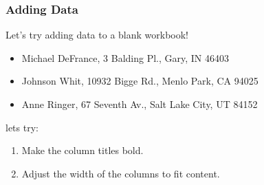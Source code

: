 \documentclass[12pt]{beamer}
\begin{document}
	\begin{frame}
		\frametitle{Adding Data}
		Let's try adding data to a blank workbook!
		\begin{itemize}
			\item Michael DeFrance, 3 Balding Pl., Gary, IN 46403
			\item Johnson Whit, 10932 Bigge Rd., Menlo Park, CA 94025
			\item Anne Ringer, 67 Seventh Av., Salt Lake City, UT 84152
		\end{itemize}
		lets try:
		\begin{enumerate}
			\item Make the column titles bold.
			\item Adjust the width of the columns to fit content.
		\end{enumerate}
	\end{frame}
	
\end{document}
